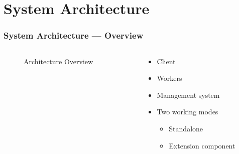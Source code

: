 \section{System Architecture}
\begin{frame}
  \frametitle{System Architecture --- Overview}
  \begin{columns}

    \begin{column}{.55\textwidth}
      \begin{figure}
        \resizebox{\linewidth}{!}{
          
        }
        \caption{Architecture Overview}
        \label{fig:archi-overview}
      \end{figure}
    \end{column}
    \begin{column}{.4\textwidth}
      \begin{itemize}
        \item Client
        \item Workers
        \item Management system
        \item Two working modes
          \begin{itemize}
            \item Standalone
            \item Extension component
          \end{itemize}
      \end{itemize}
    \end{column}

  \end{columns}
\end{frame}
